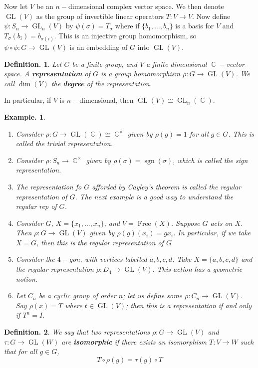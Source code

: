 \documentclass[11pt, a4paper]{memoir}
\DeclareMathOperator{\C}{{\mathbb{C}}}
\theoremstyle{change}
\theoremstyle{plain}
\theoremstyle{nonumberplain}
\newtheorem{definition}{Definition.}
\newtheorem{example}{Example.}
\DeclareMathOperator{\GL}{GL}
\DeclareMathOperator{\sgn}{sgn}
\DeclareMathOperator{\Free}{Free}
\numberwithin{equation}{section}
\begin{document}
Now let $V$ be an $n-$dimensional complex vector space.
We then denote $\GL(V)$ as the group of invertible linear operators $T:V\to V$.
Now define $\psi:S_n\to\GL_n(V)$ by $\psi(\sigma)=T_\sigma$ where if $\{b_1,\ldots,b_n\}$ is a basis for $V$ and $T_\sigma(b_i)=b_{\sigma(i)}$.
This is an injective group homomorphism, so $\psi\circ\phi:G\to\GL(V)$ is an embedding of $G$ into $\GL(V)$.
\begin{definition}
    Let $G$ be a finite group, and $V$ a finite dimensional $\C-$vector space.
    A \textbf{representation} of $G$ is a group homomorphism $\rho:G\to\GL(V)$.
    We call $\dim(V)$ the \textbf{degree} of the representation.
\end{definition}
In particular, if $V$ is $n-$dimensional, then $\GL(V)\cong\GL_n(\C)$.
\begin{example}
    \begin{enumerate}[nl]
        \item Consider $\rho:G\to\GL(\C)\cong\C^\times$ given by $\rho(g)=1$ for all $g\in G$.
            This is called the \textit{trivial representation}.
        \item Consider $\rho:S_n\to\C^\times$ given by $\rho(\sigma)=\sgn(\sigma)$, which is called the \textit{sign representation}.
        \item The representation fo $G$ afforded by Cayley's theorem is called the \textit{regular representation} of $G$.
            The next example is a good way to understand the regular rep of $G$.
        \item Consider $G$, $X=\{x_1,\ldots,x_n\}$, and $V=\Free(X)$.
            Suppose $G$ acts on $X$.
            Then $\rho:G\to\GL(V)$ given by $\rho(g)(x_i)=gx_i$.
            In particular, if we take $X=G$, then this is the regular representation of $G$
        \item Consider the $4-$gon, with vertices labelled $a,b,c,d$.
            Take $X=\{a,b,c,d\}$ and the regular representation $\rho:D_4\to\GL(V)$.
            This action has a geometric notion.
        \item Let $C_n$ be a cyclic group of order $n$; let us define some $\rho:C_n\to\GL(V)$.
            Say $\rho(x) = T$ where $t\in\GL(V)$; then this is a representation if and only if $T^n=I$.
    \end{enumerate}
\end{example}
\begin{definition}
    We say that two representations $\rho:G\to\GL(V)$ and $\tau:G\to\GL(W)$ are \textbf{isomorphic} if there exists an isomorphism $T:V\to W$ such that for all $g\in G$,
    \begin{equation*}
        T\circ \rho(g) = \tau(g)\circ T
    \end{equation*}
\end{definition}
\end{document}
